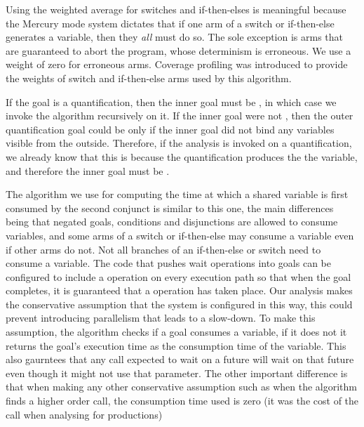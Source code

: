 Using the weighted average for switches and if-then-elses is meaningful because
the Mercury mode system dictates
that if one arm of a switch or if-then-else generates a variable,
then they \emph{all} must do so.
The sole exception is arms that are guaranteed to abort the program,
whose determinism is erroneous.
We use a weight of zero for erroneous arms.
Coverage profiling was introduced to provide the weights of switch and
if-then-else arms used by this algorithm.

If the goal is a quantification,
then the inner goal must be \ddet,
in which case we invoke the algorithm recursively on it.
If the inner goal were not \ddet,
then the outer quantification goal could be \ddet
only if the inner goal did not bind any variables visible from the outside.
Therefore, if the analysis is invoked on a quantification,
we already know that this is because the quantification produces the
the variable, and therefore the inner goal must be \ddet.

The algorithm we use for computing the time
at which a shared variable is first consumed by the second conjunct
is similar to this one,
the main differences being that
negated goals, conditions and disjunctions are allowed to consume variables,
and some arms of a switch or if-then-else
may consume a variable even if other arms do not.
Not all branches of an if-then-else or switch need to consume a variable.
The code that pushes wait operations into goals can be configured to include
a \wait operation on every execution path so that when the goal completes,
it is guaranteed that a \wait operation has taken place.
Our analysis makes the conservative assumption that the system is configured
in this way,
this could prevent introducing parallelism that leads to a slow-down.
To make this assumption,
the algorithm checks if a goal consumes a variable, if it does not it
returns the goal's execution time as the consumption time of the variable.
This also gaurntees that any call expected to wait on a future will wait on
that future even though it might not use that parameter.
The other important difference is that when making
any other conservative assumption
such as when the algorithm finds a higher order call,
the consumption time used is zero
(it was the cost of the call when analysing for productions)

